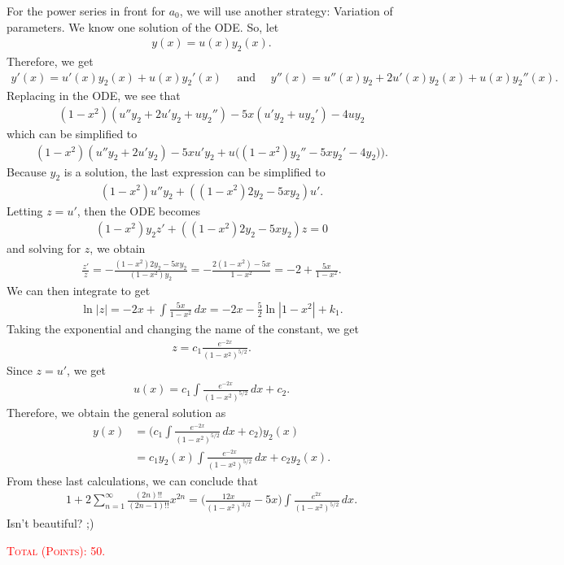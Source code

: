 \documentclass[12pt]{article}
\begin{document}
	For the power series in front for $a_0$, we will use another strategy: Variation of parameters. We know one solution of the ODE. So, let 
		\begin{align*}
		y(x) = u(x) y_2 (x) .
		\end{align*}
	Therefore, we get 
		\begin{align*}
		y' (x) = u' (x) y_2 (x) + u(x) y_2'(x) \quad \text{ and } \quad y'' (x) = u'' (x) y_2 + 2 u'(x) y_2 (x) + u(x) y_2''(x) .
		\end{align*}
	Replacing in the ODE, we see that
		\begin{align*}
		(1 - x^2) (u'' y_2 + 2 u'y_2+ u y_2'') - 5x (u'y_2 + u y_2') - 4 uy_2
		\end{align*}
	which can be simplified to
		\begin{align*}
		(1 - x^2) (u'' y_2 + 2u' y_2) - 5x u' y_2 + u \Big( (1 - x^2) y_2'' - 5x y_2' - 4y_2) \Big) .
		\end{align*}
	Because $y_2$ is a solution, the last expression can be simplified to
		\begin{align*}
		(1 - x^2) u'' y_2+ ((1 - x^2) 2y_2 - 5x y_2) u' .
		\end{align*}
	Letting $z = u'$, then the ODE becomes
		\begin{align*}
		(1 - x^2) y_2 z' + ( (1 - x^2) 2y_2 - 5x y_2) z = 0
		\end{align*}
	and solving for $z$, we obtain
		\begin{align*}
		\frac{z'}{z} = -\frac{ (1 - x^2) 2y_2 - 5x y_2}{(1 - x^2)y_2} = - \frac{2 (1 - x^2) - 5x}{1 - x^2} = -2 + \frac{5x}{1 - x^2} .
		\end{align*}
	We can then integrate to get
		\begin{align*}
		\ln |z| = -2x + \int \frac{5x}{1 - x^2} \, dx = -2x - \frac{5}{2} \ln |1 - x^2| + k_1 .
		\end{align*}
	Taking the exponential and changing the name of the constant, we get
		\begin{align*}
		z = c_1 \frac{e^{-2x}}{(1 - x^2)^{5/2}} .
		\end{align*}
	Since $z = u'$, we get
		\begin{align*}
		u (x) = c_1 \int \frac{e^{-2x}}{(1 - x^2)^{5/2}} \, dx + c_2 .
		\end{align*}
	Therefore, we obtain the general solution as
		\begin{align*}
		y(x) &= \Big( c_1 \int \frac{e^{-2x}}{(1 - x^2)^{5/2}} \, dx + c_2 \Big) y_2 (x) \\
		&= c_1 y_2 (x) \int \frac{e^{-2x}}{(1 - x^2)^{5/2}} \, dx + c_2 y_2 (x) .
		\end{align*}
	From these last calculations, we can conclude that
		\begin{align*}
		1 + 2 \sum_{n = 1}^\infty \frac{(2n)!!}{(2n - 1)!!} x^{2n} = \Big( \frac{12x}{(1 - x^2)^{3/2}} - 5x \Big) \int \frac{e^{2x}}{(1 - x^2)^{5/2}} \, dx .
		\end{align*}
	Isn't beautiful? ;)
	
	\vfill
	
	\hfill \textcolor{red}{\textsc{Total (Points): 50.}}
	
	
	
\end{document}
